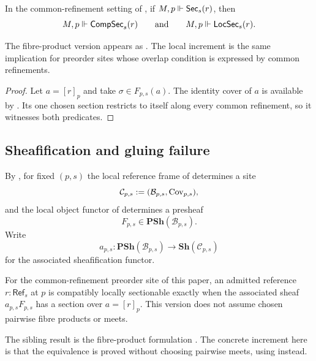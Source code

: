 \begin{proposition}\label{prop:global-implies-compatible-local}
In the common-refinement setting of , if
$M,p\Vdash \mathsf{Sec}_s(r)$, then
\[
M,p\Vdash \mathsf{CompSec}_s(r)
\qquad\text{and}\qquad
M,p\Vdash \mathsf{LocSec}_s(r).
\]
\end{proposition}

\begin{remark}
The fibre-product version appears as \cite[Proposition~4.5]{HomologicalVisibilityGluingObstructions2026}.
The local increment is the same implication for preorder sites whose overlap
condition is expressed by common refinements.
\end{remark}

\begin{proof}
Let $a=[r]_p$ and take $\sigma\in F_{p,s}(a)$. The identity cover of $a$ is
available by . Its one chosen section restricts
to itself along every common refinement, so it witnesses both predicates.
\end{proof}

\subsection{Sheafification and gluing failure}

By , for fixed $(p,s)$ the local reference frame of  determines a site
\[
\mathcal{C}_{p,s}:=(\mathcal{B}_{p,s},\mathrm{Cov}_{p,s}),
\]
and the local object functor of  determines a presheaf
\[
F_{p,s}\in\mathbf{PSh}(\mathcal{B}_{p,s}).
\]
Write
\[
a_{p,s}:\mathbf{PSh}(\mathcal{B}_{p,s})\to\mathbf{Sh}(\mathcal{C}_{p,s})
\]
for the associated sheafification functor.

\begin{theorem}\label{thm:sheafification-characterization}
For the common-refinement preorder site of this paper, an admitted reference
$r:\mathsf{Ref}_s$ at $p$ is compatibly locally sectionable exactly when the
associated sheaf $a_{p,s}F_{p,s}$ has a section over $a=[r]_p$. This version does
not assume chosen pairwise fibre products or meets.
\end{theorem}

\begin{remark}
The sibling result is the fibre-product formulation
\cite[Theorem~4.6]{HomologicalVisibilityGluingObstructions2026}. The concrete
increment here is that the equivalence is proved without choosing pairwise
meets, using  instead.
\end{remark}

